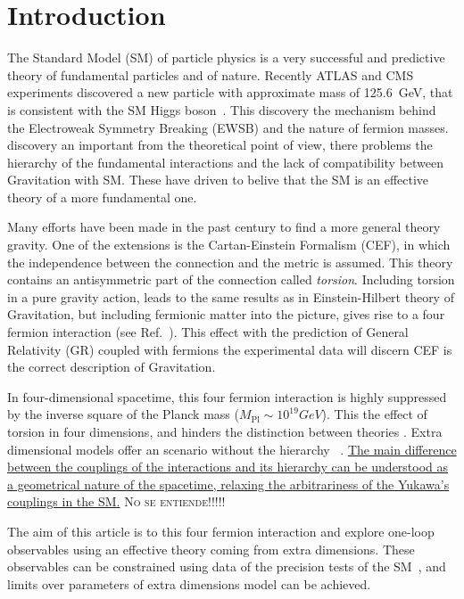 \section{Introduction}

The Standard Model (SM) of particle physics is a very successful and predictive theory of fundamental particles and   of nature. Recently ATLAS and CMS experiments discovered a new particle with approximate mass of \SI{125.6}{\GeV}, that is consistent with the SM Higgs boson~\cite{Aad:2012tfa,Chatrchyan:2012ufa}. This discovery   the mechanism behind the Electroweak Symmetry Breaking (EWSB) and the nature of fermion masses.   discovery   an important   from the theoretical point of view, there   problems   the hierarchy of the fundamental interactions and  the lack of compatibility between Gravitation with SM. These have driven  to belive that the SM is an effective theory of a more fundamental one.

Many efforts have been made in the past century %
to find a more general theory gravity. One of the extensions is the Cartan-Einstein Formalism (CEF),  in which the independence between the connection and the metric  is assumed. This theory  contains an antisymmetric part of the connection called \textit{torsion}. Including torsion in a pure gravity action, leads to the same results as in Einstein-Hilbert theory of Gravitation, but including fermionic matter into the picture, gives rise to a four fermion interaction  (see Ref.~\cite{Hehl:1976kj}). This effect   with the prediction of General Relativity (GR) coupled with fermions  the experimental data will discern   CEF is the correct description of Gravitation.

In four-dimensional spacetime, this four fermion interaction is highly suppressed by the inverse square of the  Planck mass ($M_{\text{Pl}}\sim\si{10^{19}}{GeV}$). This    the effect of torsion  in four dimensions, and hinders the  distinction between theories . Extra dimensional models  offer an scenario without the hierarchy ~\cite{Randall:1999ee,ArkaniHamed:1998rs}. \uline{The main difference between the couplings of the interactions and its hierarchy can be understood as a geometrical nature of the spacetime, relaxing the arbitrariness of the Yukawa's couplings in the SM.} \textsc{No se entiende!!!!!}

The aim of  this article is to   this four fermion interaction and explore one-loop observables using an effective theory coming from extra dimensions. These observables can be constrained using data of the precision tests of the SM~\cite{Altarelli:2004fq,Beringer:1900zz}, and limits over parameters of extra dimensions model can be achieved. 

